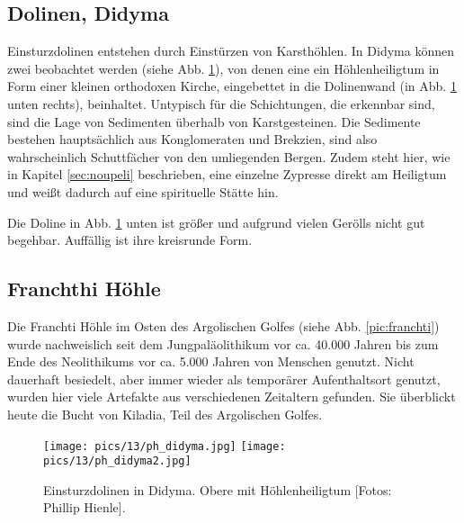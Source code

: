 \documentclass[preprint]{geomorphica} %
\begin{document}
\subsection{Dolinen, Didyma}

Einsturzdolinen entstehen durch Einstürzen von Karsthöhlen. In Didyma können zwei beobachtet werden (siehe Abb. \ref{pic:didyma}), von denen eine ein Höhlenheiligtum in Form einer kleinen orthodoxen Kirche, eingebettet in die Dolinenwand (in Abb. \ref{pic:didyma} unten rechts), beinhaltet. Untypisch für die Schichtungen, die erkennbar sind, sind die Lage von Sedimenten überhalb von Karstgesteinen. Die Sedimente bestehen hauptsächlich aus Konglomeraten und Brekzien, sind also wahrscheinlich Schuttfächer von den umliegenden Bergen. Zudem steht hier, wie in Kapitel \ref{sec:noupeli} beschrieben, eine einzelne Zypresse direkt am Heiligtum und weißt dadurch auf eine spirituelle Stätte hin.

Die Doline in Abb. \ref{pic:didyma} unten ist größer und aufgrund vielen Gerölls nicht gut begehbar. Auffällig ist ihre kreisrunde Form. 

\subsection{Franchthi Höhle}

Die Franchti Höhle im Osten des Argolischen Golfes (siehe Abb. \ref{pic:franchti}) wurde nachweislich seit dem Jungpaläolithikum vor ca. 40.000 Jahren bis zum Ende des Neolithikums vor ca. 5.000 Jahren von Menschen genutzt. Nicht dauerhaft besiedelt, aber immer wieder als temporärer Aufenthaltsort genutzt, wurden hier viele Artefakte aus verschiedenen Zeitaltern gefunden. Sie überblickt heute die Bucht von Kiladia, Teil des Argolischen Golfes. 

\begin{figure}[!h]
    \centering
    \texttt{[image: pics/13/ph\_didyma.jpg]}
    \texttt{[image: pics/13/ph\_didyma2.jpg]}
    \caption{Einsturzdolinen in Didyma. Obere mit Höhlenheiligtum [Fotos: Phillip Hienle].}
    \label{pic:didyma}
\end{figure}
\end{document}
